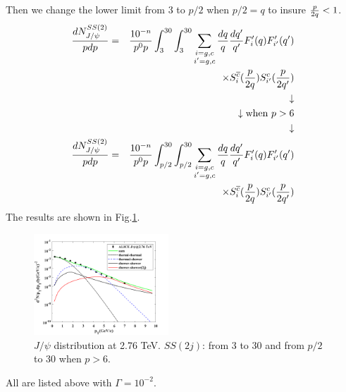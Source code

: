 \documentclass[twocolumn,aps,superscriptaddress,nofootinbib,floatfix]{revtex4}
\begin{document}
Then we change the lower limit from 3 to $p/2$ when $p/2=q$ to insure ${p\over 2q}<1$.
\begin{eqnarray}
	\frac{dN^{SS(2)}_{J/\psi}}{pdp}&=&\frac{10^{-n}}{p^0p}
	\int^{30}_{3}\int^{30}_{3}
	\sum_{\substack{i=g,c\\ i'=g,c}}  \frac{dq}{q}\frac{dq'}{q'}F'_i(q)F'_{i'}(q')\nonumber \\
	&&\times  S_i^{\overline c}({p\over 2q})   S_{i'}^c({p\over 2q'})\\
	&&\downarrow   \nonumber \\
	&&\downarrow   \text{when $p>6$}	 \nonumber \\
	&&\downarrow   \nonumber \\
	\frac{dN^{SS(2)}_{J/\psi}}{pdp}&=&\frac{10^{-n}}{p^0p}
	\int^{30}_{p/2}\int^{30}_{p/2}
	\sum_{\substack{i=g,c\\ i'=g,c}}  \frac{dq}{q}\frac{dq'}{q'}F'_i(q)F'_{i'}(q')\nonumber \\
	&&\times  S_i^{\overline c}({p\over 2q})   S_{i'}^c({p\over 2q'})
\end{eqnarray}
The results are shown in Fig.\ref{fig22}.
\begin{figure}[H]
	\includegraphics[width=0.45\textwidth]{2p_3_30.png}
	\caption{$J/\psi$ distribution at 2.76 TeV. $SS(2j)$: from 3 to 30 and from $p/2$ to 30 when $p>6$.}
	\label{fig22}
\end{figure}
All are listed above with $\Gamma=10^{-2}$. 
\end{document}
